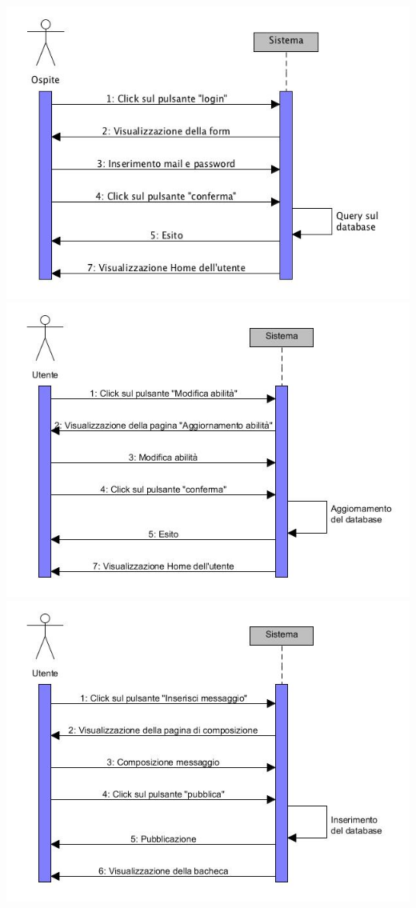 \documentclass[a4paper,12pt]{article}
\begin{document}
\begin{flushleft}
\includegraphics[scale=0.8]{sDiagrams/login.jpg} \\[2\baselineskip]
\includegraphics[scale=0.8]{sDiagrams/modificaAbilita.jpg} \\[2\baselineskip]
\includegraphics[scale=0.8]{sDiagrams/creazioneThread.jpg} \\[2\baselineskip]

\end{flushleft}
\end{document}
